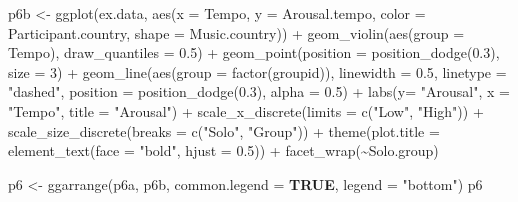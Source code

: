 \documentclass[
  bookmarksnumbered]{article}
\newenvironment{Shaded}{\begin{snugshade}}{\end{snugshade}}
\newcommand{\AttributeTok}[1]{\textcolor[rgb]{0.80,0.80,0.80}{#1}}
\newcommand{\ConstantTok}[1]{\textcolor[rgb]{0.86,0.64,0.64}{\textbf{#1}}}
\newcommand{\DecValTok}[1]{\textcolor[rgb]{0.86,0.86,0.80}{#1}}
\newcommand{\FloatTok}[1]{\textcolor[rgb]{0.75,0.75,0.82}{#1}}
\newcommand{\FunctionTok}[1]{\textcolor[rgb]{0.94,0.94,0.56}{#1}}
\newcommand{\NormalTok}[1]{\textcolor[rgb]{0.80,0.80,0.80}{#1}}
\newcommand{\OtherTok}[1]{\textcolor[rgb]{0.94,0.94,0.56}{#1}}
\newcommand{\SpecialCharTok}[1]{\textcolor[rgb]{0.86,0.64,0.64}{#1}}
\newcommand{\StringTok}[1]{\textcolor[rgb]{0.80,0.58,0.58}{#1}}
\begin{document}
\begin{Shaded}
\begin{Highlighting}[]
\NormalTok{p6b }\OtherTok{\textless{}{-}} \FunctionTok{ggplot}\NormalTok{(ex.data, }\FunctionTok{aes}\NormalTok{(}\AttributeTok{x =}\NormalTok{ Tempo, }\AttributeTok{y =}\NormalTok{ Arousal.tempo, }
                           \AttributeTok{color =}\NormalTok{ Participant.country, }\AttributeTok{shape =}\NormalTok{ Music.country)) }\SpecialCharTok{+}
   \FunctionTok{geom\_violin}\NormalTok{(}\FunctionTok{aes}\NormalTok{(}\AttributeTok{group =}\NormalTok{ Tempo), }\AttributeTok{draw\_quantiles =} \FloatTok{0.5}\NormalTok{) }\SpecialCharTok{+}
  \FunctionTok{geom\_point}\NormalTok{(}\AttributeTok{position =} \FunctionTok{position\_dodge}\NormalTok{(}\FloatTok{0.3}\NormalTok{), }\AttributeTok{size =} \DecValTok{3}\NormalTok{) }\SpecialCharTok{+}
  \FunctionTok{geom\_line}\NormalTok{(}\FunctionTok{aes}\NormalTok{(}\AttributeTok{group =} \FunctionTok{factor}\NormalTok{(groupid)), }
            \AttributeTok{linewidth =} \FloatTok{0.5}\NormalTok{, }\AttributeTok{linetype =} \StringTok{"dashed"}\NormalTok{, }\AttributeTok{position =} \FunctionTok{position\_dodge}\NormalTok{(}\FloatTok{0.3}\NormalTok{), }\AttributeTok{alpha =} \FloatTok{0.5}\NormalTok{) }\SpecialCharTok{+}
  \FunctionTok{labs}\NormalTok{(}\AttributeTok{y=} \StringTok{"Arousal"}\NormalTok{, }\AttributeTok{x =} \StringTok{"Tempo"}\NormalTok{, }\AttributeTok{title =} \StringTok{"Arousal"}\NormalTok{) }\SpecialCharTok{+}
  \FunctionTok{scale\_x\_discrete}\NormalTok{(}\AttributeTok{limits =} \FunctionTok{c}\NormalTok{(}\StringTok{"Low"}\NormalTok{, }\StringTok{"High"}\NormalTok{)) }\SpecialCharTok{+} 
  \FunctionTok{scale\_size\_discrete}\NormalTok{(}\AttributeTok{breaks =} \FunctionTok{c}\NormalTok{(}\StringTok{"Solo"}\NormalTok{, }\StringTok{"Group"}\NormalTok{)) }\SpecialCharTok{+} 
  \FunctionTok{theme}\NormalTok{(}\AttributeTok{plot.title =} \FunctionTok{element\_text}\NormalTok{(}\AttributeTok{face =} \StringTok{"bold"}\NormalTok{, }\AttributeTok{hjust =} \FloatTok{0.5}\NormalTok{)) }\SpecialCharTok{+} 
  \FunctionTok{facet\_wrap}\NormalTok{(}\SpecialCharTok{\textasciitilde{}}\NormalTok{Solo.group)}

\NormalTok{p6 }\OtherTok{\textless{}{-}} \FunctionTok{ggarrange}\NormalTok{(p6a, p6b,}
                \AttributeTok{common.legend =} \ConstantTok{TRUE}\NormalTok{,}
                \AttributeTok{legend =} \StringTok{"bottom"}\NormalTok{)}
\NormalTok{p6}
\end{Highlighting}
\end{Shaded}
\end{document}

